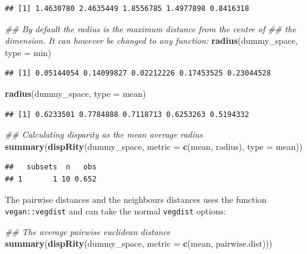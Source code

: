 \documentclass[
]{book}
\newenvironment{Shaded}{\begin{snugshade}}{\end{snugshade}}
\newcommand{\CommentTok}[1]{\textcolor[rgb]{0.56,0.35,0.01}{\textit{#1}}}
\newcommand{\DataTypeTok}[1]{\textcolor[rgb]{0.13,0.29,0.53}{#1}}
\newcommand{\KeywordTok}[1]{\textcolor[rgb]{0.13,0.29,0.53}{\textbf{#1}}}
\newcommand{\NormalTok}[1]{#1}
\begin{document}
\begin{verbatim}
## [1] 1.4630780 2.4635449 1.8556785 1.4977898 0.8416318
\end{verbatim}

\begin{Shaded}
\begin{Highlighting}[]
\CommentTok{\#\# By default the radius is the maximum distance from the centre of}
\CommentTok{\#\# the dimension. It can however be changed to any function:}
\KeywordTok{radius}\NormalTok{(dummy\_space, }\DataTypeTok{type =}\NormalTok{ min)}
\end{Highlighting}
\end{Shaded}

\begin{verbatim}
## [1] 0.05144054 0.14099827 0.02212226 0.17453525 0.23044528
\end{verbatim}

\begin{Shaded}
\begin{Highlighting}[]
\KeywordTok{radius}\NormalTok{(dummy\_space, }\DataTypeTok{type =}\NormalTok{ mean)}
\end{Highlighting}
\end{Shaded}

\begin{verbatim}
## [1] 0.6233501 0.7784888 0.7118713 0.6253263 0.5194332
\end{verbatim}

\begin{Shaded}
\begin{Highlighting}[]
\CommentTok{\#\# Calculating disparity as the mean average radius}
\KeywordTok{summary}\NormalTok{(}\KeywordTok{dispRity}\NormalTok{(dummy\_space,}
                 \DataTypeTok{metric =} \KeywordTok{c}\NormalTok{(mean, radius),}
                 \DataTypeTok{type =}\NormalTok{ mean))}
\end{Highlighting}
\end{Shaded}

\begin{verbatim}
##   subsets  n   obs
## 1       1 10 0.652
\end{verbatim}

The pairwise distances and the neighbours distances uses the function \texttt{vegan::vegdist} and can take the normal \texttt{vegdist} options:

\begin{Shaded}
\begin{Highlighting}[]
\CommentTok{\#\# The average pairwise euclidean distance}
\KeywordTok{summary}\NormalTok{(}\KeywordTok{dispRity}\NormalTok{(dummy\_space, }\DataTypeTok{metric =} \KeywordTok{c}\NormalTok{(mean, pairwise.dist)))}
\end{Highlighting}
\end{Shaded}
\end{document}

